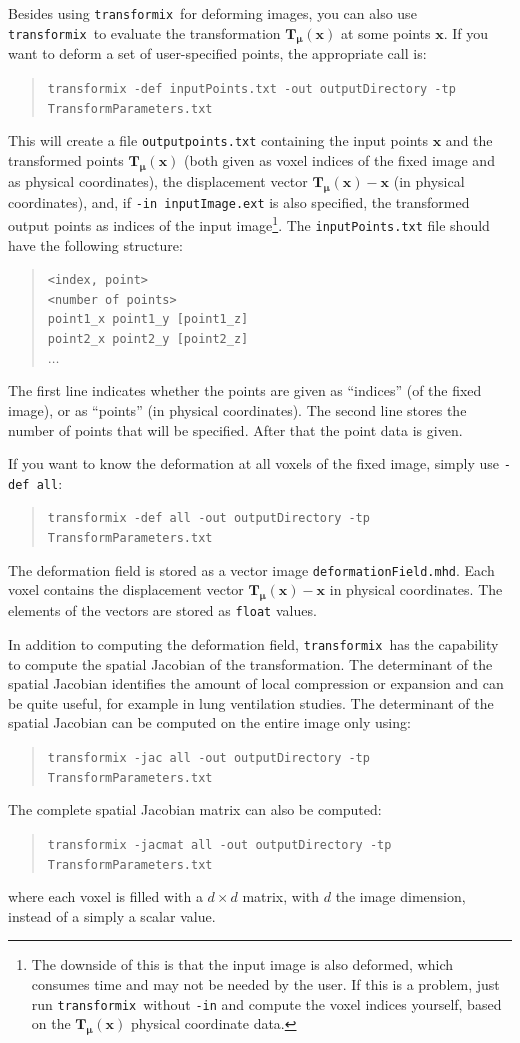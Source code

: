 \documentclass[]{report}
\newcommand{\transformix}{\texttt{transformix}}
\newcommand{\vx}{\bm{x}}
\newcommand{\vmu}{\bm{\mu}}
\newcommand{\vTmx}{\bm{T}_{\vmu}(\bm{x})}
\begin{document}
Besides using \transformix\ for deforming images, you can also use
\transformix\ to evaluate the transformation $\vTmx$ at some
points $\vx$. If you want to deform a set of user-specified
points, the appropriate call is:
\begin{quote}
\texttt{transformix -def inputPoints.txt -out outputDirectory -tp
TransformParameters.txt}
\end{quote}
This will create a file \texttt{outputpoints.txt} containing the
input points $\vx$ and the transformed points $\vTmx$ (both given
as voxel indices of the fixed image and as physical coordinates),
the displacement vector $\vTmx-\vx$ (in physical coordinates),
and, if \texttt{-in inputImage.ext} is also specified, the
transformed output points as indices of the input
image\footnote{The downside of this is that the input image is
also deformed, which consumes time and may not be needed by the
user. If this is a problem, just run \transformix\ without
\texttt{-in} and compute the voxel indices yourself, based on the
$\vTmx$ physical coordinate data.}. The \texttt{inputPoints.txt}
file should have the following structure:
\begin{quote}
\texttt{<index, point>}\\
\texttt{<number of points>}\\
\texttt{point1\_x point1\_y [point1\_z]}\\
\texttt{point2\_x point2\_y [point2\_z]}\\
\texttt{$\ldots$}
\end{quote}
The first line indicates whether the points are given as
``indices'' (of the fixed image), or as ``points'' (in physical
coordinates). The second line stores the number of points that
will be specified. After that the point data is given.

If you want to know the deformation at all voxels of the fixed
image, simply use \texttt{-def all}:
\begin{quote}
\texttt{transformix -def all -out outputDirectory -tp
TransformParameters.txt}
\end{quote}
The deformation field is stored as a vector image
\texttt{deformationField.mhd}. Each voxel contains the
displacement vector $\vTmx-\vx$ in physical coordinates. The
elements of the vectors are stored as \texttt{float} values.

In addition to computing the deformation field, \transformix\ has
the capability to compute the spatial Jacobian of the
transformation. The determinant of the spatial Jacobian identifies
the amount of local compression or expansion and can be quite
useful, for example in lung ventilation studies. The determinant of
the spatial Jacobian can be computed on the entire image only using:
\begin{quote}
\texttt{transformix -jac all -out outputDirectory -tp
TransformParameters.txt}
\end{quote}
The complete spatial Jacobian matrix can also be computed:
\begin{quote}
\texttt{transformix -jacmat all -out outputDirectory -tp
TransformParameters.txt}
\end{quote}
where each voxel is filled with a $d \times d$ matrix, with $d$ the
image dimension, instead of a simply a scalar value.
\end{document}
